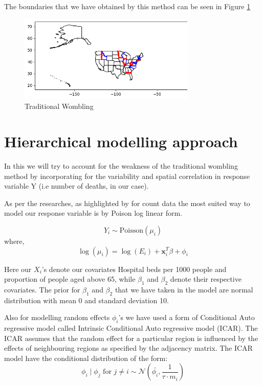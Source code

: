 \documentclass[enabledeprecatedfontcommands,parskip=half,twoside=semi,BCOR=0mm]{scrreprt}
\numberwithin{equation}{chapter}
\theoremstyle{definition}
\theoremstyle{remark}
\begin{document}
    The boundaries that we have obtained by this method can be seen in Figure \ref{fig:Figure 3}
    \begin{figure}[h]
    \centering
    \includegraphics[width=0.75\textwidth]{Traditional.png}
    \caption{Traditional Wombling}
    \label{fig:Figure 3}
    \end{figure}
    
    \section{Hierarchical modelling approach}
    
    In this we will try to account for the weakness of the traditional wombling method by incorporating for the variability and spatial correlation in response variable Y (i.e number of deaths, in our case).
    
    As per the researches, as highlighted by \cite{Lu_Carlin.2005} for count data the most suited way to model our response variable is by Poison log linear form.
    
    \[ Y_i \sim \text{Poisson}(\mu_i) \]
    where,
    \[
    \log(\mu_i) = \log(E_i) + \mathbf{x}_i^T \beta + \phi_i
    \]
    
    Here our \(X_i\)'s denote our covariates Hospital beds per 1000 people and proportion of people aged above 65, while \(\beta_1\) and \(\beta_2\) denote their respective covariates. The prior for \(\beta_1\) and \(\beta_2\) that we have taken in the model are normal distribution with mean 0 and standard deviation 10.
    
    Also for modelling random effects \(\phi_i\)'s we have used a form of Conditional Auto regressive model called Intrinsic Conditional Auto regressive model (ICAR). The ICAR assumes that the random effect for a particular region is influenced by the effects of neighbouring regions as specified by the adjacency matrix. The ICAR model have the conditional distribution of the form:
    \[
    \phi_i \mid \phi_j \text{ for } j \neq i \sim \mathcal{N}\left(\bar{\phi_i}, \frac{1}{\tau \cdot m_i}\right)
    \]
\end{document}
